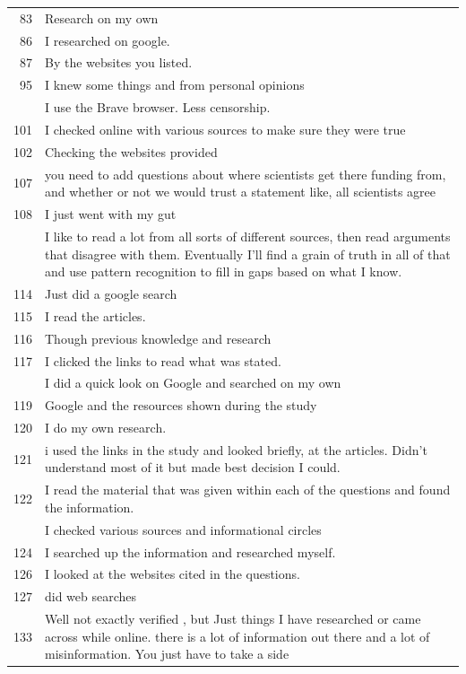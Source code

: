 \documentclass[
  doc,floatsintext]{apa6}
\begin{document}
\begin{longtable}[t]{>{}r>{\raggedright\arraybackslash}p{30em}}
83 & Research on my own\\
86 & I researched on google.\\
87 & By the websites you listed.\\
95 & I knew some things and from personal opinions\\
\addlinespace
98 & I use the Brave browser. Less censorship.\\
101 & I checked online with various sources to make sure they were true\\
102 & Checking the websites provided\\
107 & you need to add questions about where scientists get there funding from, and whether or not we would trust a statement like, all scientists agree\\
108 & I just went with my gut\\
\addlinespace
111 & I like to read a lot from all sorts of different sources, then read arguments that disagree with them. Eventually I'll find a grain of truth in all of that and use pattern recognition to fill in gaps based on what I know.\\
114 & Just did a google search\\
115 & I read the articles.\\
116 & Though previous knowledge and research\\
117 & I clicked the links to read what was stated.\\
\addlinespace
118 & I did a quick look on Google and searched on my own\\
119 & Google and the resources shown during the study\\
120 & I do my own research.\\
121 & i used the links in the study and looked briefly, at the articles.  Didn't understand most of it but made best decision I could.\\
122 & I read the material that was given within each of the questions and found the information.\\
\addlinespace
123 & I checked various sources and informational circles\\
124 & I searched up the information and researched myself.\\
126 & I looked at the websites cited in the questions.\\
127 & did web searches\\
133 & Well not exactly verified , but Just things I have researched or came across while online. there is a lot of information out there and a lot of misinformation. You just have to take a side\\

\end{longtable}
\end{document}
